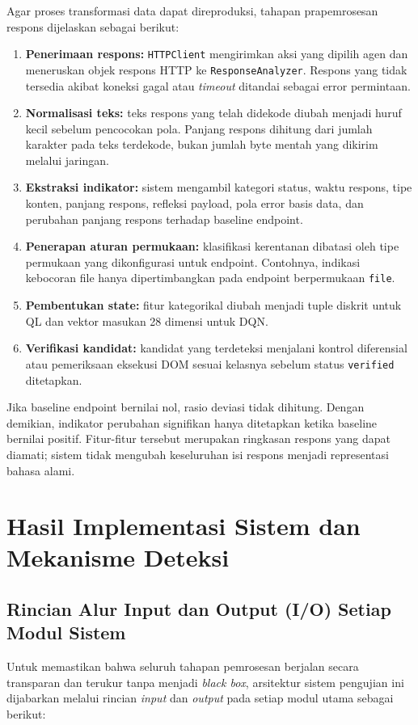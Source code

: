 \begin{enumerate}
Agar proses transformasi data dapat direproduksi, tahapan prapemrosesan respons dijelaskan sebagai berikut:
\begin{enumerate}
    \item \textbf{Penerimaan respons:} \texttt{HTTPClient} mengirimkan aksi yang dipilih agen dan meneruskan objek respons HTTP ke \texttt{ResponseAnalyzer}. Respons yang tidak tersedia akibat koneksi gagal atau \textit{timeout} ditandai sebagai error permintaan.
    \item \textbf{Normalisasi teks:} teks respons yang telah didekode diubah menjadi huruf kecil sebelum pencocokan pola. Panjang respons dihitung dari jumlah karakter pada teks terdekode, bukan jumlah byte mentah yang dikirim melalui jaringan.
    \item \textbf{Ekstraksi indikator:} sistem mengambil kategori status, waktu respons, tipe konten, panjang respons, refleksi payload, pola error basis data, dan perubahan panjang respons terhadap baseline endpoint.
    \item \textbf{Penerapan aturan permukaan:} klasifikasi kerentanan dibatasi oleh tipe permukaan yang dikonfigurasi untuk endpoint. Contohnya, indikasi kebocoran file hanya dipertimbangkan pada endpoint berpermukaan \texttt{file}.
    \item \textbf{Pembentukan state:} fitur kategorikal diubah menjadi tuple diskrit untuk QL dan vektor masukan 28 dimensi untuk DQN.
    \item \textbf{Verifikasi kandidat:} kandidat yang terdeteksi menjalani kontrol diferensial atau pemeriksaan eksekusi DOM sesuai kelasnya sebelum status \texttt{verified} ditetapkan.
\end{enumerate}

Jika baseline endpoint bernilai nol, rasio deviasi tidak dihitung. Dengan demikian, indikator perubahan signifikan hanya ditetapkan ketika baseline bernilai positif. Fitur-fitur tersebut merupakan ringkasan respons yang dapat diamati; sistem tidak mengubah keseluruhan isi respons menjadi representasi bahasa alami.

\section{Hasil Implementasi Sistem dan Mekanisme Deteksi}

\subsection{Rincian Alur Input dan Output (I/O) Setiap Modul Sistem}
Untuk memastikan bahwa seluruh tahapan pemrosesan berjalan secara transparan dan terukur tanpa menjadi \textit{black box}, arsitektur sistem pengujian ini dijabarkan melalui rincian \textit{input} dan \textit{output} pada setiap modul utama sebagai berikut:


\end{enumerate}

